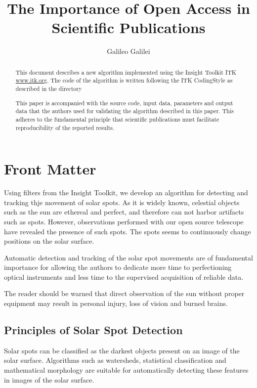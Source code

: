 \documentclass{InsightArticle}
\title{The Importance of Open Access in Scientific Publications}
\author{Galileo Galilei}
\begin{document}
\maketitle


\ifhtml
\chapter*{Front Matter\label{front}}
\fi


\begin{abstract}
\noindent
This document describes a new algorithm implemented using the Insight Toolkit
ITK \url{www.itk.org}.  The code of the algorithm is written following the 
ITK CodingStyle as described in the directory


This paper is accompanied with the source code, input data, parameters and
output data that the authors used for validating the algorithm described in
this paper. This adheres to the fundamental principle that scientific
publications must facilitate reproducibility of the reported results.
\end{abstract}

\tableofcontents

Using filters from the Insight Toolkit, we develop an algorithm for detecting
and tracking thje movement of solar spots. As it is widely known, celestial
objects such as the sun are ethereal and perfect, and therefore can not harbor
artifacts such as spots. However, observations performed with our open source
telescope have revealed the presence of such spots. The spots seems to continuously change positions on the solar surface. 

Automatic detection and tracking of the solar spot movements are of fundamental
importance for allowing the authors to dedicate more time to perfectioning
optical instruments and less time to the supervised acquisition of reliable
data.

The reader should be warned that direct observation of the sun without proper
equipment may result in personal injury, loss of vision and burned brains.

\section{Principles of Solar Spot Detection}

Solar spots can be classified as the darkest objects present on an image of the
solar surface. Algorithms such as watersheds, statistical classification and
mathematical morphology are suitable for automatically detecting these features
in images of the solar surface.
\end{document}
